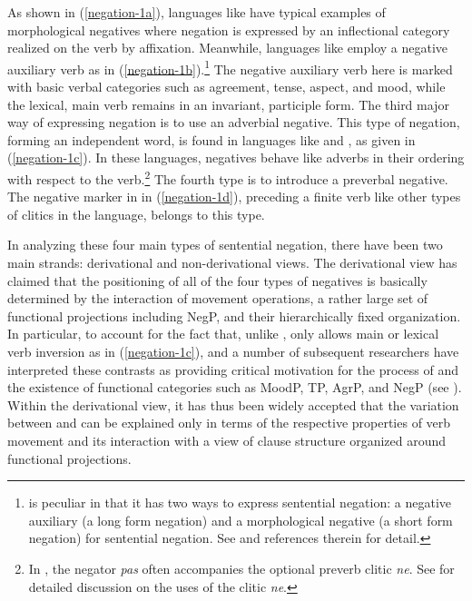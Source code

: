 \documentclass[output=paper
	        ,collection
	        ,collectionchapter
 	        ,biblatex
                ,babelshorthands
                ,newtxmath
                ,draftmode
                ,colorlinks, citecolor=brown
]{langscibook}
\begin{document}
\noindent
As shown in (\ref{negation-1a}), languages like 
have typical examples of morphological negatives where
negation is expressed by an inflectional category realized on the
verb by affixation. Meanwhile, languages like 
 employ a negative auxiliary verb as in (\ref{negation-1b}).\footnote{
 is peculiar in that it has two ways to
 express sentential negation: a negative auxiliary (a long form
 negation)  and a morphological negative (a short form negation)
 for sentential negation. See \citet{Kim:00,Kim:16} and references therein for detail.}
  The negative auxiliary
 verb here is marked with basic verbal categories such as agreement, tense, aspect, and mood, while the lexical, main verb remains in an invariant, participle form. The third major way of expressing negation is to use an adverbial
negative. This type of negation, forming an independent word, is found in
languages like  and , as given in (\ref{negation-1c}). In these languages, negatives behave like adverbs in their ordering with respect to the verb.\footnote{In , the negator \emph{pas}
often accompanies the optional preverb clitic \emph{ne}. See \citet{Godard:2004} for detailed discussion on the uses of the clitic \emph{ne}.} The fourth
type is to introduce a preverbal negative. The negative marker in  in (\ref{negation-1d}), preceding a finite verb like other types of clitics in the language,
belongs to this type.


In analyzing these four main types of sentential negation, there have been two main strands: derivational and non-derivational views. The derivational view has claimed that the positioning of all of the
four types of negatives is basically determined by the interaction of movement
operations, a rather large set of functional projections including NegP,
and their hierarchically fixed organization.
In particular, to account for the
fact that, unlike , only  allows main or lexical verb inversion
as in (\ref{negation-1c}), \citet{Pollock:89,Pollock:94} and a number of subsequent researchers
have interpreted these contrasts as providing critical motivation for
the process of  and the existence of functional
categories such as MoodP, TP, AgrP, and NegP (see \citealt{Belletti:90, Zanuttini:97,Chomsky:91,Chomsky:93,Lasnik:95, Haegeman:95,Haegeman:97, Vikner97a-u, Zanuttini:2001, Zeijlstra:15}).
Within the derivational view, it has thus been widely
accepted that the variation between  and  can be explained only in terms of the respective properties of verb movement and its interaction with a view of clause
structure organized around functional projections.
\end{document}
